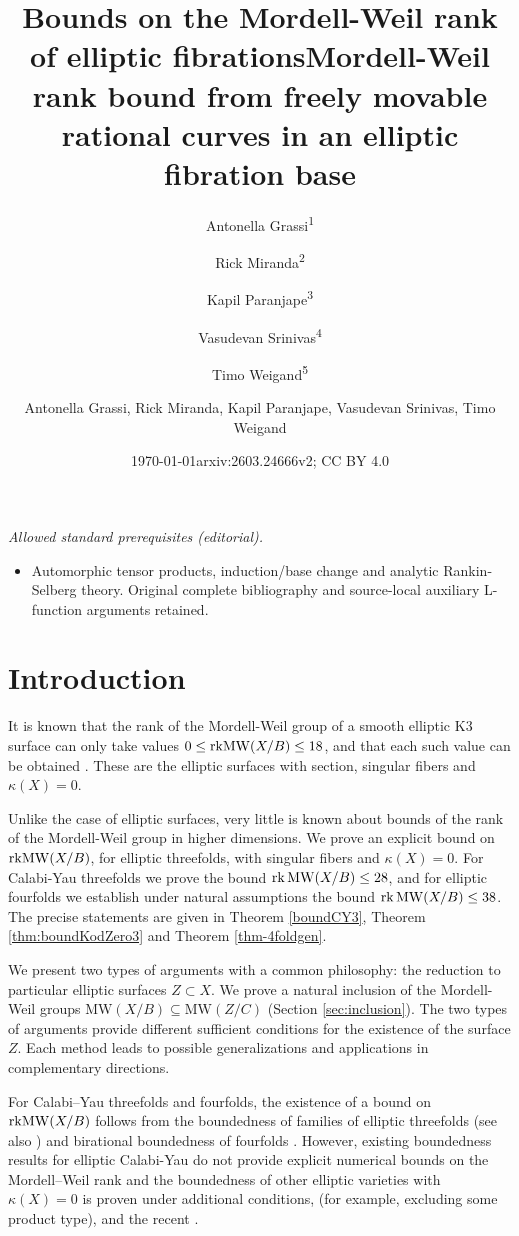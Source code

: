 \documentclass[11pt]{amsart}
\title[Bounds on Mordell-Weil ranks]{Bounds on the Mordell-Weil rank of elliptic  fibrations}
\author[Grassi]{Antonella Grassi\textsuperscript{1}}
\author[Miranda]{Rick Miranda\textsuperscript{2}}
\author[Paranjape]{Kapil Paranjape\textsuperscript{3}}
\author[Srinivas]{Vasudevan Srinivas\textsuperscript{4}}
\author[Weigand]{Timo Weigand\textsuperscript{5}}
\date{\today}
\title{Mordell-Weil rank bound from freely movable rational curves in an elliptic fibration base}
\author{Antonella Grassi, Rick Miranda, Kapil Paranjape, Vasudevan Srinivas, Timo Weigand}
\date{arxiv:2603.24666v2; CC BY 4.0}
\theoremstyle{definition}
\theoremstyle{definition}
\theoremstyle{remark}
\theoremstyle{remark}
\theoremstyle{definition}
\theoremstyle{conjecture}
\newcommand{\MW}{\mathrm{MW}}
\begin{document}
\maketitle
\noindent\textit{Allowed standard prerequisites (editorial).}\begin{itemize}
\item Automorphic tensor products, induction/base change and analytic Rankin-Selberg theory. Original complete bibliography and source-local auxiliary L-function arguments retained.
\end{itemize}\medskip
\section{Introduction}





  It is known that the rank of the Mordell-Weil group  of a  smooth  elliptic
  K3 surface can only take values 
  $0 \leq {\rm rk}\MW(X/B)\leq 18$,  and that each such value can be obtained \cite{Cox1982, Kuwata2000MW,Kloosterman2007}. These are  the elliptic surfaces with section, singular fibers and $\kappa(X)=0$.

Unlike the case of elliptic surfaces, very little is known  about bounds of the rank of the Mordell-Weil group in higher dimensions. 
We prove an explicit bound on $ {\rm rk}\MW(X/B)$, for elliptic threefolds, with singular fibers and   $\kappa(X) = 0$. 
  For  Calabi-Yau threefolds we prove the  bound 
  $\mathrm{rk}\,{\rm MW} (X/B) \le 28$, and for elliptic fourfolds we establish  under natural assumptions the %
  bound $\mathrm{rk}\,{\rm MW} (X/B) \le 38$.  The precise statements %
 are given in   Theorem \ref{boundCY3}, Theorem \ref{thm:boundKodZero3} and Theorem \ref{thm-4foldgen}.
 


We present  two types of arguments with a common philosophy: the reduction to particular elliptic surfaces $Z \subset X$.   
We  prove a natural inclusion of the Mordell-Weil groups
$\MW(X/B) \subseteq \MW(Z/C)$
(Section \ref{sec:inclusion}). 
The two types of arguments provide different sufficient conditions  for the existence of  the surface $Z$. 
  Each method leads to possible generalizations  and applications in complementary directions.  
\color{black}



For Calabi{--}Yau threefolds and fourfolds, the existence of a bound on ${\rm rk}\MW(X/B)$  follows from the boundedness of families of elliptic threefolds \cite{Filipazzi:2021dcw} (see also \cite{Gross1994}) and birational boundedness of fourfolds \cite{engel2025boundednessfiberedktrivialvarieties}.  
 However, existing boundedness results for elliptic Calabi-Yau do not provide explicit numerical bounds on the Mordell{--}Weil rank and the  boundedness  of other elliptic varieties with $\kappa(X)=0$  is proven under additional conditions, (for example, excluding  some product type),  \cite{Birkar_2024, DiCerboSvaldi, Filipazzi:2021dcw, Gross1994} and the  recent \cite{FilipazziXu2026boundednessellipticcalabiyau4folds}. 
 
\end{document}
